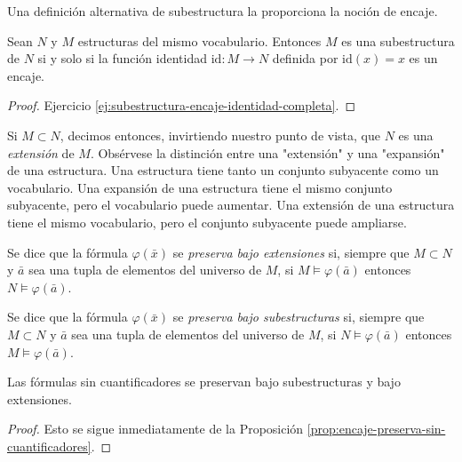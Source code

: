 \message{ !name(main.tex)}\documentclass[12pt,a4paper]{book}
\newcommand{\comillas}[1]{"#1"}
\begin{document}
    Una definición alternativa de subestructura la proporciona la noción de encaje.

    \begin{proposicion}\label{prop:subestructura-encaje-identidad}
        Sean $N$ y $M$ estructuras del mismo vocabulario. Entonces $M$ es una subestructura de $N$ si y solo si la función
        identidad $\mathrm{id}:M\rightarrow N$ definida por $\mathrm{id}(x)=x$ es un encaje.
    \end{proposicion}
    \begin{proof}
        Ejercicio \ref{ej:subestructura-encaje-identidad-completa}.
    \end{proof}

    Si $M\subset N$, decimos entonces, invirtiendo nuestro punto de vista, que $N$ es una \textit{extensión} de $M$.
    Obsérvese la distinción entre una \comillas{extensión} y una \comillas{expansión} de una estructura. Una estructura
    tiene tanto un conjunto subyacente como un vocabulario. Una expansión de una estructura tiene el mismo conjunto
    subyacente, pero el vocabulario puede aumentar. Una extensión de una estructura tiene el mismo vocabulario, pero el
    conjunto subyacente puede ampliarse.

    \begin{definicion}\label{def:preservada-extensiones}
        Se dice que la fórmula $\varphi(\bar{x})$ se \textit{preserva bajo extensiones} si, siempre que $M\subset N$ y
        $\bar{a}$ sea una tupla de elementos del universo de $M$, si $M\models\varphi(\bar{a})$ entonces
        $N\models\varphi(\bar{a})$.
    \end{definicion}

    \begin{definicion}\label{def:preservada-subestructuras}
        Se dice que la fórmula $\varphi(\bar{x})$ se \textit{preserva bajo subestructuras} si, siempre que $M\subset N$ y
        $\bar{a}$ sea una tupla de elementos del universo de $M$, si $N\models\varphi(\bar{a})$ entonces
        $M\models\varphi(\bar{a})$.
    \end{definicion}

    \begin{proposicion}\label{prop:sin-cuantificadores-preservada}
        Las fórmulas sin cuantificadores se preservan bajo subestructuras y bajo extensiones.
    \end{proposicion}
    \begin{proof}
        Esto se sigue inmediatamente de la Proposición \ref{prop:encaje-preserva-sin-cuantificadores}.
    \end{proof}
\end{document}
